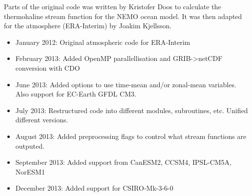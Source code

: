 \documentclass[a4paper]{article}
\begin{document}
Parts of the original code was written by Kristofer Doos to calculate the thermohaline stream function for the NEMO ocean model.
It was then adapted for the atmosphere (ERA-Interim) by Joakim Kjellsson.
%
\begin{itemize}

\item January 2012: Original atmospheric code for ERA-Interim

\item February 2013: Added OpenMP parallellisation and GRIB->netCDF conversion with CDO

\item June 2013: Added options to use time-mean and/or zonal-mean variables. Also support for EC-Earth GFDL CM3.

\item July 2013: Restructured code into different modules, subroutines, etc. Unified different versions.

\item August 2013: Added preprocessing flags to control what stream functions are outputed.

\item September 2013: Added support from CanESM2, CCSM4, IPSL-CM5A, NorESM1

\item December 2013: Added support for CSIRO-Mk-3-6-0

\end{itemize}
\end{document}
